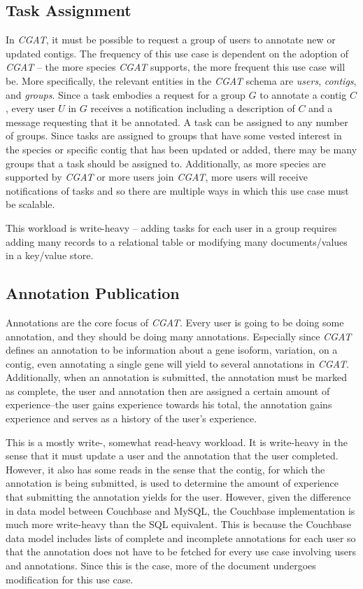 \documentclass[]{IEEEtran}
\begin{document}
\subsection{Task Assignment}
In \textit{CGAT}, it must be possible to request a group of users to annotate
new or updated contigs. The frequency of this use case is dependent on the
adoption of \textit{CGAT} -- the more species \textit{CGAT} supports, the more
frequent this use case will be. More specifically, the relevant entities in the
\textit{CGAT} schema are \textit{users}, \textit{contigs}, and \textit{groups}.
Since a task embodies a request for a group $G$ to annotate a contig $C$, every
user $U$ in $G$ receives a notification including a description of $C$ and a
message requesting that it be annotated. A task can be assigned to any number
of groups. Since tasks are assigned to groups that have some vested interest in
the species or specific contig that has been updated or added, there may be
many groups that a task should be assigned to. Additionally, as more species
are supported by \textit{CGAT} or more users join \textit{CGAT}, more users
will receive notifications of tasks and so there are multiple ways in which
this use case must be scalable.

This workload is write-heavy -- adding tasks for each user in a group requires
adding many records to a relational table or modifying many documents/values
in a key/value store.

\subsection{Annotation Publication}
Annotations are the core focus of \textit{CGAT}. Every user is going to be
doing some annotation, and they should be doing many annotations. Especially
since \textit{CGAT} defines an annotation to be information about a gene
isoform, variation, on a contig, even annotating a single gene will yield to several
annotations in \textit{CGAT}. Additionally, when an annotation is submitted,
the annotation must be marked as complete, the user and annotation then are
assigned a certain amount of experience--the user gains experience towards
his total, the annotation gains experience and serves as a history of the
user's experience.

This is a mostly write-, somewhat read-heavy workload. It is write-heavy in the
sense that it must update a user and the annotation that the user completed.
However, it also has some reads in the sense that the contig, for which the
annotation is being submitted, is used to determine the amount of experience
that submitting the annotation yields for the user. However, given the
difference in data model between Couchbase and MySQL, the Couchbase
implementation is much more write-heavy than the SQL equivalent. This is
because the Couchbase data model includes lists of complete and incomplete
annotations for each user so that the annotation does not have to be fetched
for every use case involving users and annotations. Since this is the case,
more of the document undergoes modification for this use case.
\end{document}
